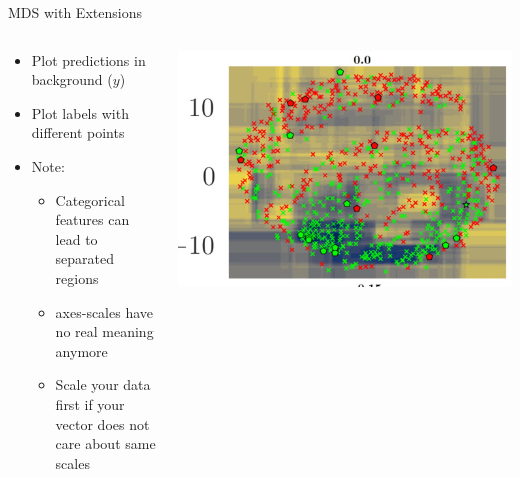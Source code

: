 \documentclass[aspectratio=169]{../latex_main/tntbeamer}  %
\begin{document}
	\begin{frame}[c]{MDS with Extensions}
        
        \begin{columns}
        
        \begin{column}{0.5\textwidth}
        
        \begin{itemize}
            \item Plot predictions in background ($y$)
            \item Plot labels with different points
            \smallskip
            \item Note: 
            \begin{itemize}
                \item Categorical features can lead to separated regions
                \item axes-scales have no real meaning anymore
                \item Scale your data first if your vector does not care about same scales 
            \end{itemize}
        \end{itemize}
        
        \end{column}
        
        \begin{column}{0.5\textwidth}
        
        \begin{center}
            \includegraphics[width=1\textwidth]{mds1.jpg}
        \end{center}
        
        \end{column}
        
        \end{columns}
        
	\end{frame}
	
\end{document}
